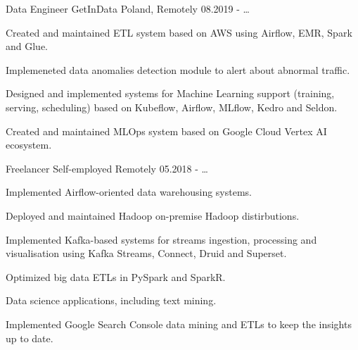 

\begin{cventries}

  \cventry
    {Data Engineer} %
    {GetInData} %
    {Poland, Remotely} %
    {08.2019 - \ldots} %
    {
      \begin{cvitems} %
        \item {Created and maintained ETL system based on AWS using Airflow, EMR, Spark and Glue.}
        \item {Implemeneted data anomalies detection module to alert about abnormal traffic.}
        \item {Designed and implemented systems for Machine Learning support (training, serving, scheduling) based on Kubeflow, Airflow, MLflow, Kedro and Seldon.}
        \item {Created and maintained MLOps system based on Google Cloud Vertex AI ecosystem.}
      \end{cvitems}
    }

  \cventry
    {Freelancer} %
    {Self-employed} %
    {Remotely} %
    {05.2018 - \ldots} %
    {
      \begin{cvitems} %
        \item {Implemented Airflow-oriented data warehousing systems.}
        \item {Deployed and maintained Hadoop on-premise Hadoop distirbutions.}
        \item {Implemented Kafka-based systems for streams ingestion, processing and visualisation using Kafka Streams, Connect, Druid and Superset.}
        \item {Optimized big data ETLs in PySpark and SparkR.}
        \item {Data science applications, including text mining.}
        \item {Implemented Google Search Console data mining and ETLs to keep the insights up to date.}
      \end{cvitems}
    }


\end{cventries}
